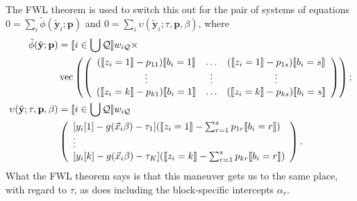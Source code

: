 \documentclass{article}
\DeclarePairedDelimiter{\indicator}{\llbracket}{\rrbracket}
\begin{document}
The FWL theorem is used to switch this out for the pair of systems of
equations $0 = \sum_{i}\tilde{\phi}(\tilde{\mathbf{y}}_{i}; \mathbf{p})$ and
$0= \sum_{i}\upsilon(\tilde{\mathbf{y}}_{i}; \tau, \mathbf{p},
\beta)$,  where
\begin{align}
  \tilde{\phi}(\tilde{\mathbf{y}}; \mathbf{p}) &=
                                                 \indicator{i \in \bigcup \mathcal{Q}} w_{i\mathcal{Q}} \times \nonumber \\
  &\operatorname{vec}\left(%
                                                 \left(
                                                 \begin{array}{ccc}
                                                   (\indicator{z_{i}=1}-p_{11})\indicator{b_{i}=1}&\ldots&(\indicator{z_{i}=1}-p_{1s})\indicator{b_{i}=s}
                                                   \\
                                                   \vdots & \vdots &
                                                                     \vdots
                                                   \\
                                                   (\indicator{z_{i}=k}-p_{k1})\indicator{b_{i}=1}&\ldots&(\indicator{z_{i}=k}-p_{ks})\indicator{b_{i}=s}\\                                                   
                                                 \end{array}
  \right)%
  \right) ;\nonumber \\
  \upsilon(\tilde{\mathbf{y}}; \tau, \mathbf{p}, \beta) &=
\indicator{i \in \bigcup \mathcal{Q}}w_{i\mathcal{Q}} \nonumber \\
&\left(
                                             \begin{array}{l}                                               
           [y_{i}[1]
                                               -
                                               g(\vec{x}_{i}\beta)-\tau_{1}](
                                               \indicator{z_{i}=1} - \sum_{r=1}^{s}p_{1r}\indicator{b_{i}=r})\\
                  \vdots \\
{}           [y_{i}[k]
                                               - g(\vec{x}_{i}\beta) -
                                               \tau_{K}](\indicator{z_{i}=k}
                                               - \sum_{r=1}^{s}p_{kr}\indicator{b_{i}=r})\\                                             \end{array}
\right) . \label{eq:upsilondef}
\end{align}
What the FWL theorem says is that this maneuver gets us to the same
place, with regard to $\tau$, as does including the block-specific
intercepts $\alpha_{r}$.
\end{document}
